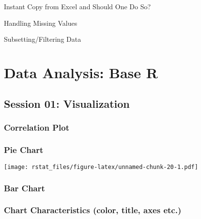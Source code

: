 \documentclass[
]{book}
\newenvironment{Shaded}{\begin{snugshade}}{\end{snugshade}}
\newcommand{\DataTypeTok}[1]{\textcolor[rgb]{0.13,0.29,0.53}{#1}}
\newcommand{\DecValTok}[1]{\textcolor[rgb]{0.00,0.00,0.81}{#1}}
\newcommand{\KeywordTok}[1]{\textcolor[rgb]{0.13,0.29,0.53}{\textbf{#1}}}
\newcommand{\NormalTok}[1]{#1}
\newcommand{\OtherTok}[1]{\textcolor[rgb]{0.56,0.35,0.01}{#1}}
\newcommand{\StringTok}[1]{\textcolor[rgb]{0.31,0.60,0.02}{#1}}
\begin{document}
Instant Copy from Excel and Should One Do So?

Handling Missing Values

Subsetting/Filtering Data

\hypertarget{rbase}{%
\chapter{Data Analysis: Base R}\label{rbase}}

\hypertarget{session-01-visualization}{%
\section{Session 01: Visualization}\label{session-01-visualization}}

\hypertarget{correlation-plot}{%
\subsection{Correlation Plot}\label{correlation-plot}}

\hypertarget{pie-chart}{%
\subsection{Pie Chart}\label{pie-chart}}

\begin{Shaded}
\end{Shaded}

\texttt{[image: rstat\_files/figure-latex/unnamed-chunk-20-1.pdf]}

\hypertarget{bar-chart}{%
\subsection{Bar Chart}\label{bar-chart}}

\hypertarget{chart-characteristics-color-title-axes-etc.}{%
\subsection{Chart Characteristics (color, title, axes etc.)}\label{chart-characteristics-color-title-axes-etc.}}
\end{document}
